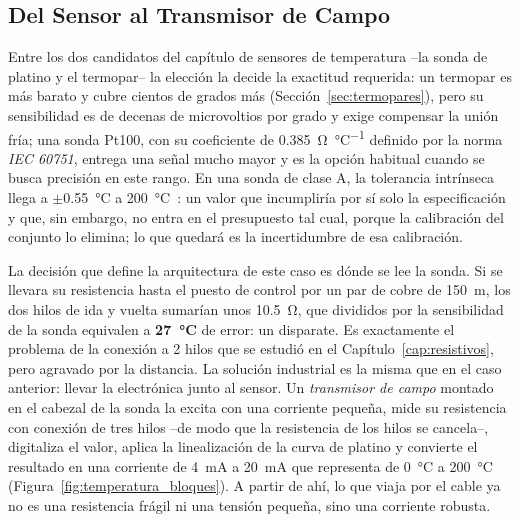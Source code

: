 \subsection{Del Sensor al Transmisor de Campo}\label{sub:temperatura_sensor}

Entre los dos candidatos del capítulo de sensores de temperatura --la sonda de platino y el termopar-- la elección la decide la exactitud requerida: un termopar es más barato y cubre cientos de grados más (Sección~\ref{sec:termopares}), pero su sensibilidad es de decenas de microvoltios por grado y exige compensar la unión fría; una sonda Pt100, con su coeficiente de \SI{0.385}{\ohm\per\degreeCelsius} definido por la norma \emph{IEC 60751}, entrega una señal mucho mayor y es la opción habitual cuando se busca precisión en este rango. En una sonda de clase A, la tolerancia intrínseca llega a $\pm$\SI{0.55}{\celsius} a \SI{200}{\celsius}~\cite{iec60751_2008}: un valor que incumpliría por sí solo la especificación y que, sin embargo, no entra en el presupuesto tal cual, porque la calibración del conjunto lo elimina; lo que quedará es la incertidumbre de esa calibración.

La decisión que define la arquitectura de este caso es dónde se lee la sonda. Si se llevara su resistencia hasta el puesto de control por un par de cobre de \SI{150}{\meter}, los dos hilos de ida y vuelta sumarían unos \SI{10.5}{\ohm}, que divididos por la sensibilidad de la sonda equivalen a \textbf{\SI{27}{\celsius}} de error: un disparate. Es exactamente el problema de la conexión a 2 hilos que se estudió en el Capítulo~\ref{cap:resistivos}, pero agravado por la distancia. La solución industrial es la misma que en el caso anterior: llevar la electrónica junto al sensor. Un \emph{transmisor de campo} montado en el cabezal de la sonda la excita con una corriente pequeña, mide su resistencia con conexión de tres hilos --de modo que la resistencia de los hilos se cancela--, digitaliza el valor, aplica la linealización de la curva de platino y convierte el resultado en una corriente de \SI{4}{\milli\ampere} a \SI{20}{\milli\ampere} que representa de \SI{0}{\celsius} a \SI{200}{\celsius} (Figura~\ref{fig:temperatura_bloques}). A partir de ahí, lo que viaja por el cable ya no es una resistencia frágil ni una tensión pequeña, sino una corriente robusta.

